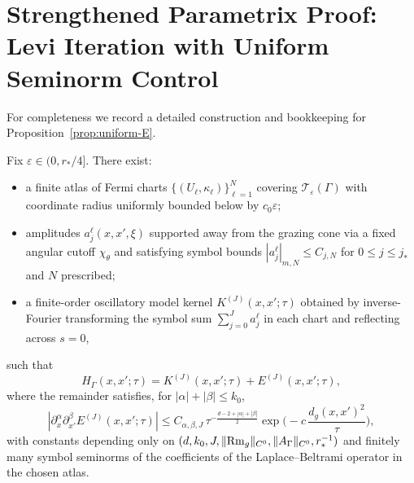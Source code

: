 \section{Strengthened Parametrix Proof: Levi Iteration with Uniform Seminorm Control}
\label{sec:levi-proof}

For completeness we record a detailed construction and bookkeeping for Proposition~\ref{prop:uniform-E}.

\begin{theorem}
\label{thm:levi-parametrix}
Fix $\varepsilon\in(0,r_*/4]$. There exist:
\begin{itemize}
\item a finite atlas of Fermi charts $\{(U_\ell,\kappa_\ell)\}_{\ell=1}^N$ covering $\mathcal T_\varepsilon(\Gamma)$ with coordinate radius uniformly bounded below by $c_0\varepsilon$;
\item amplitudes $a_j^\ell(x,x',\xi)$ supported away from the grazing cone via a fixed angular cutoff $\chi_\theta$ and satisfying symbol bounds $|a_j^\ell|_{m,N}\le C_{j,N}$ for $0\le j\le j_*$ and $N$ prescribed;
\item a finite-order oscillatory model kernel $K^{(J)}(x,x';\tau)$ obtained by inverse-Fourier transforming the symbol sum $\sum_{j=0}^J a_j^\ell$ in each chart and reflecting across $s=0$,
\end{itemize}
such that
\[
H_\Gamma(x,x';\tau) = K^{(J)}(x,x';\tau) + E^{(J)}(x,x';\tau),
\]
where the remainder satisfies, for $|\alpha|+|\beta|\le k_0$,
\[
|\partial_x^\alpha \partial_{x'}^\beta E^{(J)}(x,x';\tau)|
\le C_{\alpha,\beta,J}\,\tau^{-\frac{d-2+|\alpha|+|\beta|}{2}} \exp\!\Big(-c\,\frac{d_g(x,x')^2}{\tau}\Big),
\]
with constants depending only on $(d,k_0,J,\|{\rm Rm}_g\|_{C^0},\|A_\Gamma\|_{C^0},r_*^{-1})$ and finitely many symbol seminorms of the coefficients of the Laplace–Beltrami operator in the chosen atlas.
\end{theorem}

